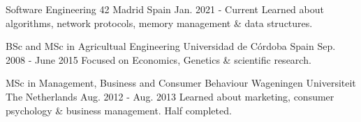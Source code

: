 
\begin{cventries}

  \cventry
    {Software Engineering} %
    {42 Madrid} %
    {Spain} %
    {Jan. 2021 - Current} %
    {
      {Learned about algorithms, network protocols, memory management \& data structures.}
    }

  \cventry
    {BSc and MSc in Agricultual Engineering} %
    {Universidad de Córdoba} %
    {Spain} %
    {Sep. 2008 - June 2015} %
    {
      {Focused on Economics, Genetics \& scientific research.}
    }

  \cventry
    {MSc in Management, Business and Consumer Behaviour} %
    {Wageningen Universiteit} %
    {The Netherlands} %
    {Aug. 2012 - Aug. 2013} %
    {
      {Learned about marketing, consumer psychology \& business management. Half completed.}
    }

\end{cventries}
